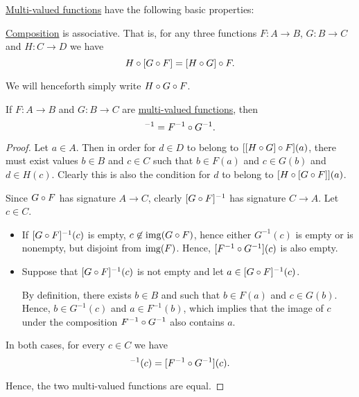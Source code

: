 \begin{proposition}\label{thm:def:multivalued_function}
  \hyperref[def:multi_valued_function]{Multi-valued functions} have the following basic properties:

  \begin{thmenum}
     \hyperref[def:multi_valued_function/composition]{Composition} is associative. That is, for any three functions \( F: A \to B \), \( G: B \to C \) and \( H: C \to D \) we have
    \begin{equation*}
      H \bincirc [G \bincirc F] = [H \bincirc G] \bincirc F.
    \end{equation*}

    We will henceforth simply write \( H \bincirc G \bincirc F \).

     If \( F: A \to B \) and \( G: B \to C \) are \hyperref[def:multi_valued_function]{multi-valued functions}, then
    \begin{equation*}
      [G \bincirc F]^{-1} = F^{-1} \bincirc G^{-1}.
    \end{equation*}
  \end{thmenum}
\end{proposition}
\begin{proof}
   Let \( a \in A \). Then in order for \( d \in D \) to belong to \( [[H \bincirc G] \bincirc F](a) \), there must exist values \( b \in B \) and \( c \in C \) such that \( b \in F(a) \) and \( c \in G(b) \) and \( d \in H(c) \). Clearly this is also the condition for \( d \) to belong to \( [H \bincirc [G \bincirc F]](a) \).

   Since \( G \bincirc F \) has signature \( A \to C \), clearly \( [G \bincirc F]^{-1} \) has signature \( C \to A \). Let \( c \in C \).

  \begin{itemize}
    \item If \( [G \bincirc F]^{-1}(c) \) is empty, \( c \not\in \img(G \bincirc F) \), hence either \( G^{-1}(c) \) is empty or is nonempty, but disjoint from \( \operatorname{img}(F) \). Hence, \( [F^{-1} \bincirc G^{-1}](c) \) is also empty.

    \item Suppose that \( [G \bincirc F]^{-1}(c) \) is not empty and let \( a \in [G \bincirc F]^{-1}(c) \).

    By definition, there exists \( b \in B \) and such that \( b \in F(a) \) and \( c \in G(b) \). Hence, \( b \in G^{-1}(c) \) and \( a \in F^{-1}(b) \), which implies that the image of \( c \) under the composition \( F^{-1} \bincirc G^{-1} \) also contains \( a \).
  \end{itemize}

  In both cases, for every \( c \in C \) we have
  \begin{equation*}
    [G \bincirc F]^{-1}(c) = [F^{-1} \bincirc G^{-1}](c).
  \end{equation*}

  Hence, the two multi-valued functions are equal.
\end{proof}

